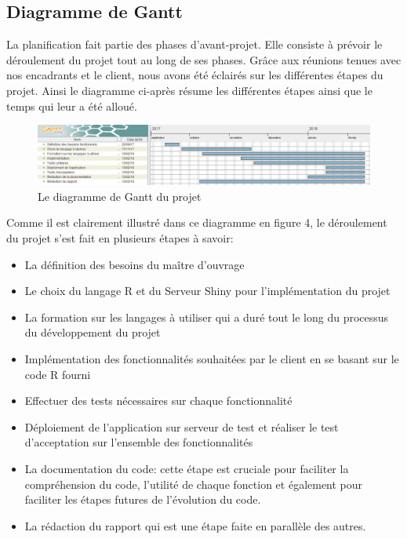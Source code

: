 	\subsection{Diagramme de Gantt}
	La planification fait partie des phases d’avant-projet. Elle consiste à prévoir le déroulement du projet tout au long de ses phases. Grâce aux réunions tenues avec nos encadrants et le client, nous avons été éclairés sur les différentes étapes du projet.
	Ainsi le diagramme ci-après résume les différentes étapes ainsi que le temps qui leur a été alloué.
	\newpage
\begin{figure}
	   \center
	   \includegraphics[scale=0.8]{img/diagramme_de_gantt.png}
	   \caption {Le diagramme de Gantt du projet}	
\end{figure}
	\newpage
   Comme il est clairement illustré dans ce diagramme en figure 4, le déroulement du projet s'est fait en plusieurs étapes à savoir:
 \begin{itemize}
\item La définition des besoins du maître d'ouvrage
\item Le choix du langage R et du Serveur Shiny pour l'implémentation du projet
\item La formation sur les langages à utiliser qui a duré tout le long du processus du développement du projet
\item Implémentation des fonctionnalités souhaitées par le client en se basant sur le code R fourni
\item Effectuer des tests nécessaires sur chaque fonctionnalité
\item Déploiement de l'application sur serveur de test et réaliser le test d'acceptation sur l'ensemble des fonctionnalités
\item La documentation du code: cette étape est cruciale pour faciliter la compréhension du code, l'utilité de chaque fonction et également pour faciliter les étapes futures  de l'évolution du code.
\item La rédaction du rapport qui est une étape faite en parallèle des autres.
 \end{itemize}